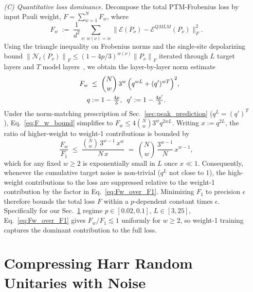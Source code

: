 \documentclass[%
 reprint,
superscriptaddress,
 amsmath,amssymb,
 aps,
]{revtex4-2}
\newcommand{\E}{\mathcal{E}}
\newcommand{\norm}[1]{\left\lVert#1\right\rVert}
\begin{document}
\emph{(C) Quantitative loss dominance.}
Decompose the total PTM-Frobenius loss by input Pauli weight, $F = \sum_{w=1}^N F_w$, where
\begin{equation}
    F_w \;:=\; \frac{1}{d^2}\sum_{\nu:\,w(\nu)=w} \bigl\|\E(P_\nu)-\E^{QMLM}(P_\nu)\bigr\|_F^2.
\end{equation}
Using the triangle inequality on Frobenius norms and the single-site depolarizing bound $\norm{\mathcal{N}_\ell(P_\nu)}_F \le (1-4p/3)^{w(\nu)}\norm{P_\nu}_F$ iterated through $L$ target layers and $T$ model layers~\cite{nielsen2002simple,magesan2012characterizing}, we obtain the layer-by-layer norm estimate
\begin{equation}
    \begin{split}
    F_w \;&\le\; \binom{N}{w}\,3^w\,\Bigl(q^{wL}+(q')^{wT}\Bigr)^2, \\
    \qquad q &:= 1-\tfrac{4p}{3},\;\; q' := 1-\tfrac{4p'}{3}.
    \end{split}
    \label{eq:F_w_bound}
\end{equation}
Under the norm-matching prescription of Sec.~\ref{sec:peak_prediction} ($q^L = (q')^T$), Eq.~\eqref{eq:F_w_bound} simplifies to $F_w \le 4\binom{N}{w}3^w q^{2wL}$. Writing $x := q^{2L}$, the ratio of higher-weight to weight-1 contributions is bounded by
\begin{equation}
    \frac{F_w}{F_1} \;\le\; \frac{\binom{N}{w}\,3^{w-1}\,x^{w}}{N\,x} \;=\; \binom{N}{w}\,\frac{3^{w-1}}{N}\,x^{w-1},
    \label{eq:Fw_over_F1}
\end{equation}
which for any fixed $w\ge 2$ is exponentially small in $L$ once $x\ll 1$. Consequently, whenever the cumulative target noise is non-trivial ($q^{L}$ not close to $1$), the high-weight contributions to the loss are suppressed relative to the weight-1 contribution by the factor in Eq.~\eqref{eq:Fw_over_F1}. Minimizing $F_1$ to precision $\epsilon$ therefore bounds the total loss $F$ within a $p$-dependent constant times $\epsilon$. Specifically for our Sec.~\ref{sec:Numerical_result_Random_U} regime $p\in[0.02,0.1]$, $L\in[3,25]$, Eq.~\eqref{eq:Fw_over_F1} gives $F_w/F_1\lesssim 1$ uniformly for $w\ge 2$, so weight-1 training captures the dominant contribution to the full loss.


\section{Compressing Harr Random Unitaries with Noise}
\label{sec:Numerical_result_Random_U}
\end{document}
